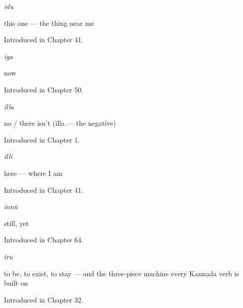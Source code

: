 \noindent\begin{minipage}[t]{\linewidth}
\raggedright
\textbf{}\enspace\emph{idu}\par
\small this one — the thing near me\par
\footnotesize Introduced in Chapter 41.
\end{minipage}\par\medskip

\noindent\begin{minipage}[t]{\linewidth}
\raggedright
\textbf{}\enspace\emph{īga}\par
\small now\par
\footnotesize Introduced in Chapter 50.
\end{minipage}\par\medskip

\noindent\begin{minipage}[t]{\linewidth}
\raggedright
\textbf{}\enspace\emph{illa}\par
\small no / there isn't (illa — the negative)\par
\footnotesize Introduced in Chapter 1.
\end{minipage}\par\medskip

\noindent\begin{minipage}[t]{\linewidth}
\raggedright
\textbf{}\enspace\emph{illi}\par
\small here — where I am\par
\footnotesize Introduced in Chapter 41.
\end{minipage}\par\medskip

\noindent\begin{minipage}[t]{\linewidth}
\raggedright
\textbf{}\enspace\emph{innū}\par
\small still, yet\par
\footnotesize Introduced in Chapter 64.
\end{minipage}\par\medskip

\noindent\begin{minipage}[t]{\linewidth}
\raggedright
\textbf{}\enspace\emph{iru}\par
\small to be, to exist, to stay — and the three-piece machine every Kannada verb is built on\par
\footnotesize Introduced in Chapter 32.
\end{minipage}\par\medskip

